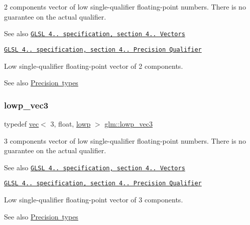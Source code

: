 2 components vector of low single-\/qualifier floating-\/point numbers. There is no guarantee on the actual qualifier.

\begin{DoxySeeAlso}{See also}
\href{http://www.opengl.org/registry/doc/GLSLangSpec.4.20.8.pdf}{\tt G\+L\+SL 4.. specification, section 4.. Vectors} 

\href{http://www.opengl.org/registry/doc/GLSLangSpec.4.20.8.pdf}{\tt G\+L\+SL 4.. specification, section 4.. Precision Qualifier}
\end{DoxySeeAlso}
Low single-\/qualifier floating-\/point vector of 2 components. \begin{DoxySeeAlso}{See also}
\mbox{\hyperlink{group__core__precision}{Precision types}} 
\end{DoxySeeAlso}
\mbox{\label{group__core__precision_ga185f659de082bad5abfa576891d0612d}} 
\subsubsection{\texorpdfstring{lowp\+\_\+vec3}{lowp\_vec3}}
{\footnotesize\ttfamily typedef \mbox{\hyperlink{structglm_1_1vec}{vec}}$<$ 3, float, \mbox{\hyperlink{namespaceglm_a36ed105b07c7746804d7fdc7cc90ff25ae161af3fc695e696ce3bf69f7332bc2d}{lowp}} $>$ \mbox{\hyperlink{group__core__precision_ga185f659de082bad5abfa576891d0612d}{glm\+::lowp\+\_\+vec3}}}

3 components vector of low single-\/qualifier floating-\/point numbers. There is no guarantee on the actual qualifier.

\begin{DoxySeeAlso}{See also}
\href{http://www.opengl.org/registry/doc/GLSLangSpec.4.20.8.pdf}{\tt G\+L\+SL 4.. specification, section 4.. Vectors} 

\href{http://www.opengl.org/registry/doc/GLSLangSpec.4.20.8.pdf}{\tt G\+L\+SL 4.. specification, section 4.. Precision Qualifier}
\end{DoxySeeAlso}
Low single-\/qualifier floating-\/point vector of 3 components. \begin{DoxySeeAlso}{See also}
\mbox{\hyperlink{group__core__precision}{Precision types}} 
\end{DoxySeeAlso}
\mbox{\label{group__core__precision_ga9235d8ac062ef68826948ac1df016036}} 

